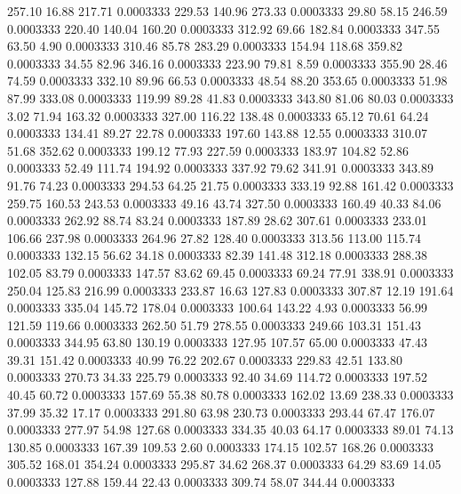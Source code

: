  257.10   16.88  217.71   0.0003333
 229.53  140.96  273.33   0.0003333
  29.80   58.15  246.59   0.0003333
 220.40  140.04  160.20   0.0003333
 312.92   69.66  182.84   0.0003333
 347.55   63.50    4.90   0.0003333
 310.46   85.78  283.29   0.0003333
 154.94  118.68  359.82   0.0003333
  34.55   82.96  346.16   0.0003333
 223.90   79.81    8.59   0.0003333
 355.90   28.46   74.59   0.0003333
 332.10   89.96   66.53   0.0003333
  48.54   88.20  353.65   0.0003333
  51.98   87.99  333.08   0.0003333
 119.99   89.28   41.83   0.0003333
 343.80   81.06   80.03   0.0003333
   3.02   71.94  163.32   0.0003333
 327.00  116.22  138.48   0.0003333
  65.12   70.61   64.24   0.0003333
 134.41   89.27   22.78   0.0003333
 197.60  143.88   12.55   0.0003333
 310.07   51.68  352.62   0.0003333
 199.12   77.93  227.59   0.0003333
 183.97  104.82   52.86   0.0003333
  52.49  111.74  194.92   0.0003333
 337.92   79.62  341.91   0.0003333
 343.89   91.76   74.23   0.0003333
 294.53   64.25   21.75   0.0003333
 333.19   92.88  161.42   0.0003333
 259.75  160.53  243.53   0.0003333
  49.16   43.74  327.50   0.0003333
 160.49   40.33   84.06   0.0003333
 262.92   88.74   83.24   0.0003333
 187.89   28.62  307.61   0.0003333
 233.01  106.66  237.98   0.0003333
 264.96   27.82  128.40   0.0003333
 313.56  113.00  115.74   0.0003333
 132.15   56.62   34.18   0.0003333
  82.39  141.48  312.18   0.0003333
 288.38  102.05   83.79   0.0003333
 147.57   83.62   69.45   0.0003333
  69.24   77.91  338.91   0.0003333
 250.04  125.83  216.99   0.0003333
 233.87   16.63  127.83   0.0003333
 307.87   12.19  191.64   0.0003333
 335.04  145.72  178.04   0.0003333
 100.64  143.22    4.93   0.0003333
  56.99  121.59  119.66   0.0003333
 262.50   51.79  278.55   0.0003333
 249.66  103.31  151.43   0.0003333
 344.95   63.80  130.19   0.0003333
 127.95  107.57   65.00   0.0003333
  47.43   39.31  151.42   0.0003333
  40.99   76.22  202.67   0.0003333
 229.83   42.51  133.80   0.0003333
 270.73   34.33  225.79   0.0003333
  92.40   34.69  114.72   0.0003333
 197.52   40.45   60.72   0.0003333
 157.69   55.38   80.78   0.0003333
 162.02   13.69  238.33   0.0003333
  37.99   35.32   17.17   0.0003333
 291.80   63.98  230.73   0.0003333
 293.44   67.47  176.07   0.0003333
 277.97   54.98  127.68   0.0003333
 334.35   40.03   64.17   0.0003333
  89.01   74.13  130.85   0.0003333
 167.39  109.53    2.60   0.0003333
 174.15  102.57  168.26   0.0003333
 305.52  168.01  354.24   0.0003333
 295.87   34.62  268.37   0.0003333
  64.29   83.69   14.05   0.0003333
 127.88  159.44   22.43   0.0003333
 309.74   58.07  344.44   0.0003333

